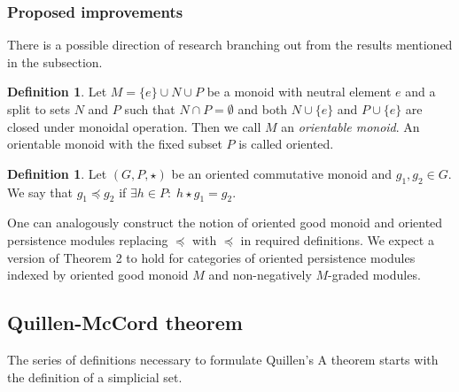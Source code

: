 \documentclass[a4paper, 12pt]{article}
\newcounter{stmcounter}[section]
\numberwithin{equation}{section}
\theoremstyle{definition}
\newtheorem{definition}[stmcounter]{Definition}
\theoremstyle{remark}
\newcommand{\define}[1]{{\textit{#1}}}
\begin{document}
\subsubsection{Proposed improvements}

There is a possible direction of research branching out from the results mentioned in the subsection.

\begin{definition}
  Let $M = \{e\} \cup N \cup P$ be a monoid with neutral element $e$ and a split to sets $N$ and $P$ such that $N \cap P = \emptyset$ and both $N \cup \{e\}$ and $P \cup \{e\}$ are closed under monoidal operation. Then we call $M$ an \define{orientable monoid}. An orientable monoid with the fixed subset $P$ is called oriented.
\end{definition}

\begin{definition}
  Let $(G,P,\star)$ be an oriented commutative monoid and $g_1, g_2 \in G$.
  We say that $g_1 \preccurlyeq g_2$ if $\exists h \in P:\; h \star g_1 = g_2$.
\end{definition}

One can analogously construct the notion of oriented good monoid and oriented persistence modules replacing $\preceq$ with $\preccurlyeq$ in required definitions. We expect a version of Theorem 2 to hold for categories of oriented persistence modules indexed by oriented good monoid $M$ and non-negatively $M$-graded modules.

\subsection{Quillen-McCord theorem}

The series of definitions necessary to formulate Quillen's A theorem starts with the definition of a simplicial set.
\end{document}
